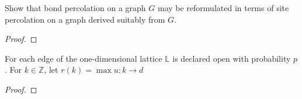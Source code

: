 \documentclass[a4paper]{article}
\begin{document}
	\begin{question}
	Show that bond percolation on a graph $G$ may be reformulated in terms of site percolation on a graph derived suitably from $G$.
	\end{question}
	\begin{proof}
	\end{proof}
	
	\begin{question}
	For each edge of the one-dimensional lattice $\mathbb{L}$ is declared open with probability $p$. For  $k \in \mathbb{Z}$, let $r(k) = \max{ u : k \to  d}$
	\end{question}
	
	\begin{question}[Question 5]
	
	\end{question}
	\begin{proof}
	
	\end{proof}
\end{document}
